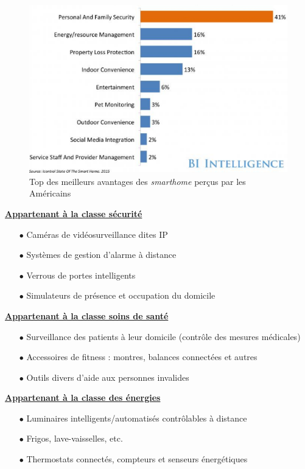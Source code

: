 \documentclass[]{article}
\newcommand{\minit}[1]{{\small\textbf{ \underline{#1}}}~\\}
\begin{document}
\begin{figure}[!h]
\centering
\includegraphics[scale=0.5]{benef_SH.png}
\caption{Top des meilleurs avantages des \textit{smarthome} perçus par les Américains}
\label{benef_SH}
\end{figure}

\minit{Appartenant à la classe sécurité}

\begin{itemize}
\item[$\bullet$] Caméras de vidéosurveillance dites IP
\item[$\bullet$] Systèmes de gestion d'alarme à distance
\item[$\bullet$] Verrous de portes intelligents
\item[$\bullet$] Simulateurs de présence et occupation du domicile
\end{itemize}

\minit{Appartenant à la classe soins de santé}

\begin{itemize}
\item[$\bullet$] Surveillance des patients à leur domicile (contrôle des mesures médicales)
\item[$\bullet$] Accessoires de fitness : montres, balances connectées et autres
\item[$\bullet$] Outils divers d'aide aux personnes invalides 
\end{itemize}

\minit{Appartenant à la classe des énergies}

\begin{itemize}
\item[$\bullet$] Luminaires intelligents/automatisés contrôlables à distance
\item[$\bullet$] Frigos, lave-vaisselles, etc. 
\item[$\bullet$] Thermostats connectés, compteurs et senseurs énergétiques
\end{itemize}
\end{document}
